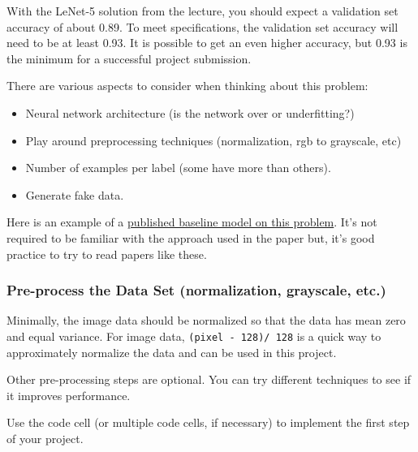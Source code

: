 \documentclass[11pt]{article}
\providecommand{\tightlist}{%
      \setlength{\itemsep}{0pt}\setlength{\parskip}{0pt}}
\begin{document}
With the LeNet-5 solution from the lecture, you should expect a
validation set accuracy of about 0.89. To meet specifications, the
validation set accuracy will need to be at least 0.93. It is possible to
get an even higher accuracy, but 0.93 is the minimum for a successful
project submission.

There are various aspects to consider when thinking about this problem:

\begin{itemize}
\tightlist
\item
  Neural network architecture (is the network over or underfitting?)
\item
  Play around preprocessing techniques (normalization, rgb to grayscale,
  etc)
\item
  Number of examples per label (some have more than others).
\item
  Generate fake data.
\end{itemize}

Here is an example of a
\href{http://yann.lecun.com/exdb/publis/pdf/sermanet-ijcnn-11.pdf}{published
baseline model on this problem}. It's not required to be familiar with
the approach used in the paper but, it's good practice to try to read
papers like these.

    \subsubsection{Pre-process the Data Set (normalization, grayscale,
etc.)}\label{pre-process-the-data-set-normalization-grayscale-etc.}

    Minimally, the image data should be normalized so that the data has mean
zero and equal variance. For image data, \texttt{(pixel\ -\ 128)/\ 128}
is a quick way to approximately normalize the data and can be used in
this project.

Other pre-processing steps are optional. You can try different
techniques to see if it improves performance.

Use the code cell (or multiple code cells, if necessary) to implement
the first step of your project.
\end{document}
